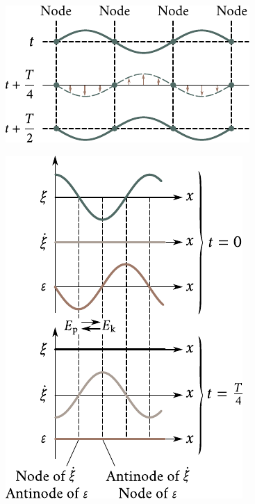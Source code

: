 \begin{figure}[t]
	\begin{minipage}[t]{0.48\linewidth}
		\begin{center}
			\includegraphics[scale=0.98]{figures/ch_14/fig_14_10.pdf}
			\caption[]{}
			\label{fig:14_10}
		\end{center}
	\end{minipage}
	\hfill{ }%
	\begin{minipage}[t]{0.48\linewidth}
		\begin{center}
			\includegraphics[scale=0.98]{figures/ch_14/fig_14_11.pdf}
			\caption[]{}
			\label{fig:14_11}
		\end{center}
	\end{minipage}
\vspace{-0.4cm}
\end{figure}

